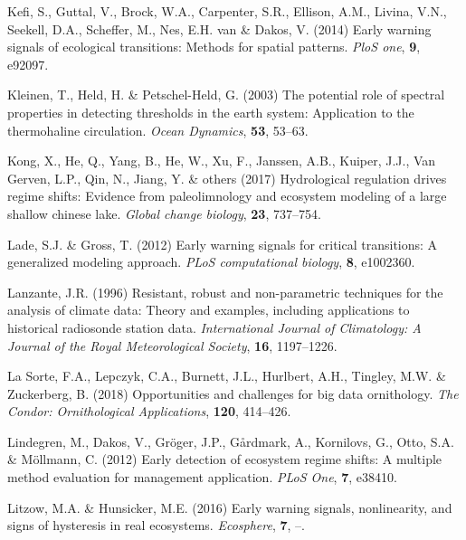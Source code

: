 \documentclass[12pt,twoside,openany]{reedthesis}
\begin{document}
\leavevmode\hypertarget{ref-kefi2014early}{}%
Kefi, S., Guttal, V., Brock, W.A., Carpenter, S.R., Ellison, A.M., Livina, V.N., Seekell, D.A., Scheffer, M., Nes, E.H. van \& Dakos, V. (2014) Early warning signals of ecological transitions: Methods for spatial patterns. \emph{PloS one}, \textbf{9}, e92097.

\leavevmode\hypertarget{ref-kleinen2003potential}{}%
Kleinen, T., Held, H. \& Petschel-Held, G. (2003) The potential role of spectral properties in detecting thresholds in the earth system: Application to the thermohaline circulation. \emph{Ocean Dynamics}, \textbf{53}, 53--63.

\leavevmode\hypertarget{ref-kong2017hydrological}{}%
Kong, X., He, Q., Yang, B., He, W., Xu, F., Janssen, A.B., Kuiper, J.J., Van Gerven, L.P., Qin, N., Jiang, Y. \& others (2017) Hydrological regulation drives regime shifts: Evidence from paleolimnology and ecosystem modeling of a large shallow chinese lake. \emph{Global change biology}, \textbf{23}, 737--754.

\leavevmode\hypertarget{ref-lade2012early}{}%
Lade, S.J. \& Gross, T. (2012) Early warning signals for critical transitions: A generalized modeling approach. \emph{PLoS computational biology}, \textbf{8}, e1002360.

\leavevmode\hypertarget{ref-lanzante1996resistant}{}%
Lanzante, J.R. (1996) Resistant, robust and non-parametric techniques for the analysis of climate data: Theory and examples, including applications to historical radiosonde station data. \emph{International Journal of Climatology: A Journal of the Royal Meteorological Society}, \textbf{16}, 1197--1226.

\leavevmode\hypertarget{ref-lasorte2018opportunities}{}%
La Sorte, F.A., Lepczyk, C.A., Burnett, J.L., Hurlbert, A.H., Tingley, M.W. \& Zuckerberg, B. (2018) Opportunities and challenges for big data ornithology. \emph{The Condor: Ornithological Applications}, \textbf{120}, 414--426.

\leavevmode\hypertarget{ref-lindegren_early_2012}{}%
Lindegren, M., Dakos, V., Gröger, J.P., Gårdmark, A., Kornilovs, G., Otto, S.A. \& Möllmann, C. (2012) Early detection of ecosystem regime shifts: A multiple method evaluation for management application. \emph{PLoS One}, \textbf{7}, e38410.

\leavevmode\hypertarget{ref-litzow_early_2016}{}%
Litzow, M.A. \& Hunsicker, M.E. (2016) Early warning signals, nonlinearity, and signs of hysteresis in real ecosystems. \emph{Ecosphere}, \textbf{7}, --.
\end{document}
